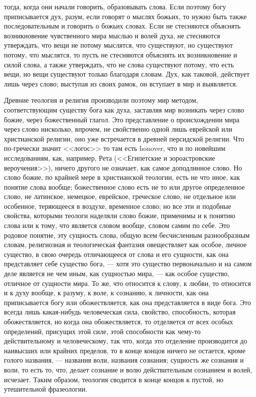 \documentclass[12pt]{article}
\begin{document}
тогда, когда они начали говорить, образовывать слова. Если поэтому богу приписывается дух, разум, если говорят о мыслях божьих, то нужно быть также последовательным и говорить о божьих словах. Если не стесняются объяснять возникновение чувственного мира мыслью и волей духа, не стесняются утверждать, что вещи не потому мыслятся, что существуют, но существуют потому, что мыслятся, то пусть не стесняются объяснять их возникновение и силой слова, а также утверждать, что не слова существуют потому, что есть вещи, но вещи существуют только благодаря словам. Дух, как таковой, действует лишь через слово; выступая из своих рамок, он вступает в мир и выявляется. 

Древние теология и религия производили поэтому мир методом, соответствующим существу бога как духа, заставляя мир возникать через слово божие, через божественный глагол. Это представление о происхождении мира через слово нисколько, впрочем, не свойственно одной лишь еврейской или христианской религии, оно уже встречается в древней персидской религии. Что по-гречески значит <<логос>>  то там есть honover, что и по новейшим исследованиям, как, например, Рета (<<Египетские и зороастровские вероучения>>), ничего другого не означает, как самое доподлинное слово. Но слово божие, по крайней мере в христианской теологии, есть не что иное, как понятие слова вообще; божественное слово есть не то или другое определенное слово, не латинское, немецкое, еврейское, греческое слово, не отдельное или особенное, теряющееся в воздухе, временное слово; но все эти и подобные свойства, которыми теологи наделяли слово божие, применимы и к понятию слова или к тому, что является словом вообще, словом самим по себе. Это родовое понятие, эту сущность слова, общую всем бесчисленным разнообразным словам, религиозная и теологическая фантазия овеществляет как особое, личное существо, в свою очередь отличающееся от слова и его сущности, как она представляет себе существо бога, --- хотя это существо первоначально и на самом деле является не чем иным, как сущностью мира, --- как особое существо, отличное от сущности мира. То же, что относится к слову, к любви, то относится и к духу вообще, к разуму, к воле, к сознанию, к личности, как она приписывается богу или обожествляется, как она представляется в виде бога. Это всегда лишь какая-нибудь человеческая сила, свойство, способность, которая обожествляется, но когда она обожествляется, то отделяется от всех особых определений, присущих этой силе, этой способности как чему-то действительному и человеческому, так что, когда это отделение производится до наивысших или крайних пределов, то в конце концов ничего не остается, кроме голого названия, --- названия воли, названия сознания; сущность же сознания и воли, то есть то, что, делает сознание и волю действительным сознанием и волей, исчезает. Таким образом, теология сводится в конце концов к пустой, но утешительной фразеологии. 
\end{document}
